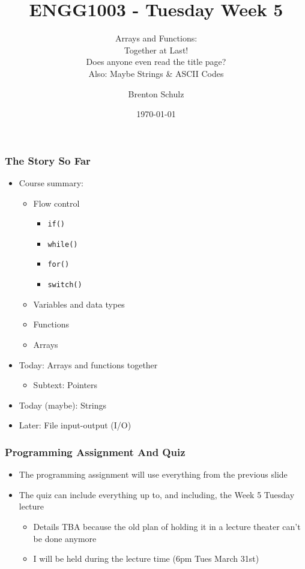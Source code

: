 \documentclass[14pt]{beamer}
\title{ENGG1003 - Tuesday Week 5}
\subtitle{Arrays and Functions:\\Together at Last!\\{\tiny{Does anyone even read the title page?}}\\Also: Maybe Strings \& ASCII Codes}
\author{Brenton Schulz}
\institute{University of Newcastle}
\date{\today}
\begin{document}
\titlepage

\begin{frame}
\frametitle{The Story So Far}
\begin{itemize}
\item Course summary:
	\begin{itemize}
		\item Flow control
			\begin{itemize}
				\item \texttt{if()}
				\item \texttt{while()}
				\item \texttt{for()}
				\item \texttt{switch()}
			\end{itemize}
		\item Variables and data types
		\item Functions
		\item Arrays
	\end{itemize}
\item Today: Arrays and functions together
	\begin{itemize}
		\item Subtext: Pointers
	\end{itemize}
\item Today (maybe): Strings
\item Later: File input-output (I/O)
\end{itemize}
\end{frame}

\begin{frame}
\frametitle{Programming Assignment And Quiz}
\begin{itemize}
\item The programming assignment will use everything from the previous slide
\item The quiz can include everything up to, and including, the Week 5 Tuesday lecture
	\begin{itemize}
		\item Details TBA because the old plan of holding it in a lecture theater can't be done anymore
		\item I will be held during the lecture time (6pm Tues March 31st)
	\end{itemize}
\end{itemize}
\end{frame}
\end{document}

